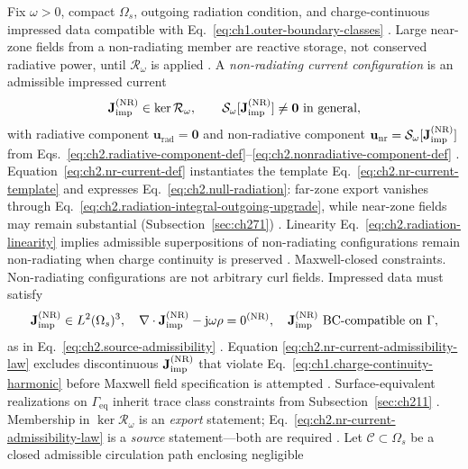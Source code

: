 Fix $\omega>0$, compact $\Omega_s$, outgoing radiation condition, and charge-continuous impressed
data compatible with Eq.~\eqref{eq:ch1.outer-boundary-classes} \cite{stratton1941}. Large
near-zone fields from a non-radiating member are reactive storage, not conserved radiative power,
until $\mathcal{R}_\omega$ is applied \cite{harrington2001}.
A \emph{non-radiating current configuration} is an admissible impressed current
\begin{equation}
\label{eq:ch2.nr-current-def}
\mathbf{J}_{\mathrm{imp}}^{\mathrm{(NR)}}\in\ker\mathcal{R}_\omega,
\qquad
\mathcal{S}_\omega[\mathbf{J}_{\mathrm{imp}}^{\mathrm{(NR)}}]\neq\mathbf{0}\ \text{in general},
\end{equation}
with radiative component \(\mathbf{u}_{\mathrm{rad}}=\mathbf{0}\) and non-radiative component
\(\mathbf{u}_{\mathrm{nr}}=\mathcal{S}_\omega[\mathbf{J}_{\mathrm{imp}}^{\mathrm{(NR)}}]\) from
Eqs.~\eqref{eq:ch2.radiative-component-def}--\eqref{eq:ch2.nonradiative-component-def}
\cite{stratton1941}. Equation~\eqref{eq:ch2.nr-current-def} instantiates the template
Eq.~\eqref{eq:ch2.nr-current-template} and expresses Eq.~\eqref{eq:ch2.null-radiation}: far-zone
export vanishes through Eq.~\eqref{eq:ch2.radiation-integral-outgoing-upgrade}, while near-zone
fields may remain substantial (Subsection~\ref{sec:ch271})
\cite{stratton1941}. Linearity Eq.~\eqref{eq:ch2.radiation-linearity} implies
admissible superpositions of non-radiating configurations remain non-radiating when charge
continuity is preserved \cite{stratton1941}.
Maxwell-closed constraints. Non-radiating configurations are not arbitrary curl fields. Impressed data must satisfy
\begin{equation}
\label{eq:ch2.nr-current-admissibility-law}
\mathbf{J}_{\mathrm{imp}}^{\mathrm{(NR)}}\in L^{2}(\Omega_s)^{3},
\quad
\nabla\cdot\mathbf{J}_{\mathrm{imp}}^{\mathrm{(NR)}}-\mathrm{j}\omega\rho=0^{\mathrm{(NR)}},
\quad
\mathbf{J}_{\mathrm{imp}}^{\mathrm{(NR)}}\ \text{BC-compatible on}\ \Gamma,
\end{equation}
as in Eq.~\eqref{eq:ch2.source-admissibility} \cite{stratton1941}. Equation
\eqref{eq:ch2.nr-current-admissibility-law} excludes discontinuous \(\mathbf{J}_{\mathrm{imp}}^{\mathrm{(NR)}}\) that
violate Eq.~\eqref{eq:ch1.charge-continuity-harmonic} before Maxwell field specification is attempted
\cite{stratton1941}. Surface-equivalent realizations on \(\Gamma_{\mathrm{eq}}\) inherit trace
class constraints from Subsection~\ref{sec:ch211} \cite{harrington2001}. Membership in
\(\ker\mathcal{R}_\omega\) is an \emph{export} statement; Eq.~\eqref{eq:ch2.nr-current-admissibility-law}
is a \emph{source} statement---both are required \cite{stratton1941}.
Let \(\mathcal{C}\subset\Omega_s\) be a closed admissible circulation path enclosing negligible

